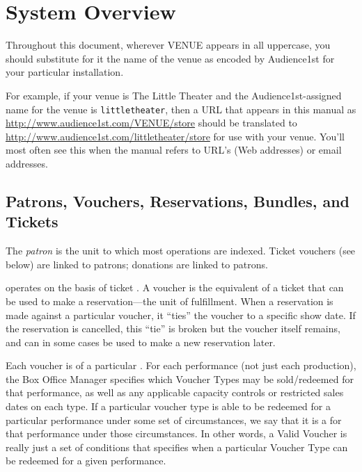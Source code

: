 \section{System Overview}

Throughout this document, wherever VENUE appears in all uppercase, you
should substitute for it the name of the venue as encoded by Audience1st
for your particular installation.

For example, if your venue is The Little Theater and the
Audience1st-assigned name for the venue is \verb+littletheater+, then a
URL that appears in this manual as
\url{http://www.audience1st.com/VENUE/store} should be translated to
\url{http://www.audience1st.com/littletheater/store} for use with your
venue.  You'll most often see this when the manual refers to URL's (Web
addresses) or email addresses.

\subsection{Patrons, Vouchers,  Reservations, Bundles, and Tickets}
\label{sec:overview-vouchers}

The \emph{patron} is the unit to which most operations are indexed.
Ticket vouchers (see below) are linked to
patrons; donations are linked to patrons.

\af operates on the basis of ticket . A voucher is the
equivalent of a ticket that can be used to make a reservation---the unit
of fulfillment.  When a
reservation is made against a particular voucher, it ``ties'' the
voucher to a specific show date.  If the reservation is cancelled, this
``tie'' is broken but the voucher itself remains, and can in some cases
be used to make  a new reservation later.

Each voucher is of a particular .  For each performance
(not just each production), the Box Office Manager specifies which
Voucher Types may be sold/redeemed for that performance, as well as any
applicable capacity controls or restricted sales dates on each type.  If
a particular voucher type is able to be redeemed for a particular
performance under some set of circumstances, we say that it is a
 for that performance under those circumstances.  In
other words, a Valid Voucher is really just a set of conditions that
specifies when a particular Voucher Type can be redeemed for a given
performance. 

